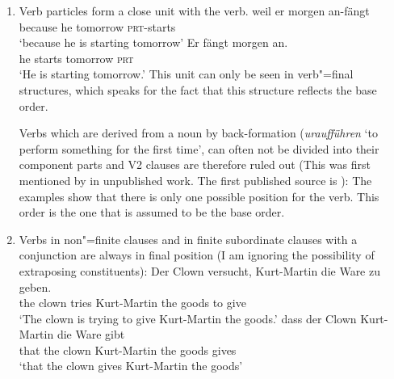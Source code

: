\begin{enumerate}
\item Verb particles form a close unit with the verb.
\eal
\ex 
\gll weil er morgen an-fängt\\
     because he tomorrow \textsc{prt}-starts\\
\glt `because he is starting tomorrow'
\ex 
\gll Er fängt morgen an.\\
	 he starts tomorrow \textsc{prt}\\
\glt `He is starting tomorrow.'
\zl
This unit can only be seen in verb"=final structures, which speaks for the fact that this structure reflects the base order.

Verbs which are derived from a noun by back-formation (\eg \emph{uraufführen} 
`to perform something for the first time', can often not be divided into their component parts and
V2 clauses are therefore ruled out (This was first mentioned by \citet{Hoehle91b} in unpublished
work. The first published source is ):
\eal
{}
\zl
The examples show that there is only one possible position for the verb. This order is the one that is assumed to be the base order.
\item Verbs in non"=finite clauses and in finite subordinate clauses with a conjunction are
always in final position (I am ignoring the possibility of extraposing constituents):
\eal
\ex 
\gll Der Clown versucht, Kurt-Martin die Ware zu geben.\\
     the clown tries Kurt-Martin the goods to give\\
\glt `The clown is trying to give Kurt-Martin the goods.'
\ex 
\gll dass der Clown Kurt-Martin die Ware gibt\\
	 that the clown Kurt-Martin the goods gives\\
\glt `that the clown gives Kurt-Martin the goods'
\zl


\end{enumerate}
